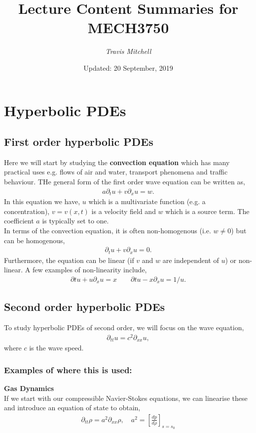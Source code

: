 \documentclass[11pt,a4paper]{report}
\author{\textit{Travis Mitchell}}
\title{Lecture Content Summaries for MECH3750}
\date{Updated: 20 September, 2019}
\theoremstyle{definition}
\begin{document}
\section{Hyperbolic PDEs}
\subsection{First order hyperbolic PDEs}
Here we will start by studying the \textbf{convection equation} which has many practical uses e.g. flows of air and water, transport phenomena and traffic behaviour. THe general form of the first order wave equation can be written as,
\begin{align*}
a\partial_t u + v \partial_x u = w.
\end{align*} 
In this equation we have, $u$ which is a multivariate function (e.g. a concentration), $v=v(x,t)$ is a velocity field and $w$ which is a source term. The coefficient $a$ is typically set to one. \\

In terms of the convection equation, it is often non-homogenous (i.e. $w\neq 0$) but can be homogenous,
\begin{align*}
\partial_t u + v \partial_x u = 0.
\end{align*}
Furthermore, the equation can be linear (if $v$ and $w$ are independent of $u$) or non-linear. A few examples of non-linearity include,
\begin{align*}
\partial t u + u \partial_x u = x \quad \quad \partial t u - x \partial_x u = 1/u.
\end{align*}

\subsection{Second order hyperbolic PDEs}
To study hyperbolic PDEs of second order, we will focus on the wave equation,
\begin{align*}
	\partial_{tt} u = c^2 \partial_{xx} u,
\end{align*}
where $c$ is the wave speed.
\subsubsection{Examples of where this is used:}
\textbf{Gas Dynamics} \\
If we start with our compressible Navier-Stokes equations, we can linearise these and introduce an equation of state to obtain,
\begin{align*}
	\partial_{tt} \rho = a^2 \partial_{xx} \rho, \quad a^2 = \left[\frac{dp}{d\rho}\right]_{s=s_0}
\end{align*}
\end{document}
